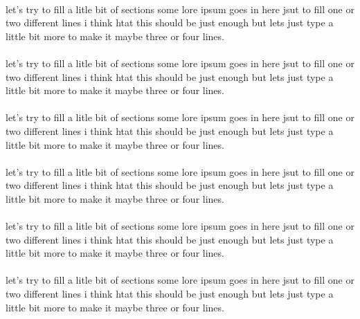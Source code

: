 \paragraph{}
let's try to fill a litle bit of sections some lore ipsum goes in here jsut to fill one or two different lines i think htat this should be just enough but lets just type a little bit more to make it maybe three or four lines.

\paragraph{}
let's try to fill a litle bit of sections some lore ipsum goes in here jsut to fill one or two different lines i think htat this should be just enough but lets just type a little bit more to make it maybe three or four lines.

\paragraph{}
let's try to fill a litle bit of sections some lore ipsum goes in here jsut to fill one or two different lines i think htat this should be just enough but lets just type a little bit more to make it maybe three or four lines.

\paragraph{}
let's try to fill a litle bit of sections some lore ipsum goes in here jsut to fill one or two different lines i think htat this should be just enough but lets just type a little bit more to make it maybe three or four lines.

\paragraph{}
let's try to fill a litle bit of sections some lore ipsum goes in here jsut to fill one or two different lines i think htat this should be just enough but lets just type a little bit more to make it maybe three or four lines.

\paragraph{}
let's try to fill a litle bit of sections some lore ipsum goes in here jsut to fill one or two different lines i think htat this should be just enough but lets just type a little bit more to make it maybe three or four lines.

